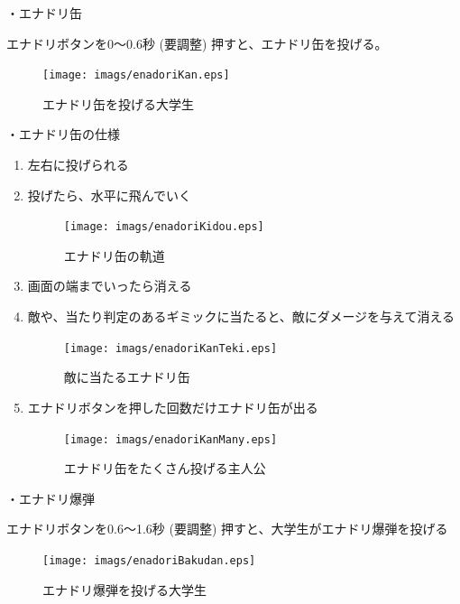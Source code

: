 \documentclass[12pt]{jsarticle}
\begin{document}
\newpage

・エナドリ缶

エナドリボタンを0〜0.6秒 (要調整) 押すと、エナドリ缶を投げる。

\begin{figure}[htbp]
  \begin{center}
    \texttt{[image: imags/enadoriKan.eps]}
    \caption{エナドリ缶を投げる大学生}
  \end{center}
\end{figure}

\newpage

・エナドリ缶の仕様

\begin{enumerate}
  \item 左右に投げられる
  \item 投げたら、水平に飛んでいく
  \begin{figure}[htbp]
    \begin{center}
      \texttt{[image: imags/enadoriKidou.eps]}
      \caption{エナドリ缶の軌道}
    \end{center}
  \end{figure}
  \item 画面の端までいったら消える
  \item 敵や、当たり判定のあるギミックに当たると、敵にダメージを与えて消える
  \begin{figure}[htbp]
    \begin{center}
      \texttt{[image: imags/enadoriKanTeki.eps]}
      \caption{敵に当たるエナドリ缶}
    \end{center}
  \end{figure}

  \newpage
  \item エナドリボタンを押した回数だけエナドリ缶が出る
  \begin{figure}[htbp]
    \begin{center}
      \texttt{[image: imags/enadoriKanMany.eps]}
      \caption{エナドリ缶をたくさん投げる主人公}
    \end{center}
  \end{figure}
\end{enumerate}

\newpage

・エナドリ爆弾

エナドリボタンを0.6〜1.6秒 (要調整) 押すと、大学生がエナドリ爆弾を投げる

\begin{figure}[htbp]
  \begin{center}
    \texttt{[image: imags/enadoriBakudan.eps]}
    \caption{エナドリ爆弾を投げる大学生}
  \end{center}
\end{figure}
\end{document}
